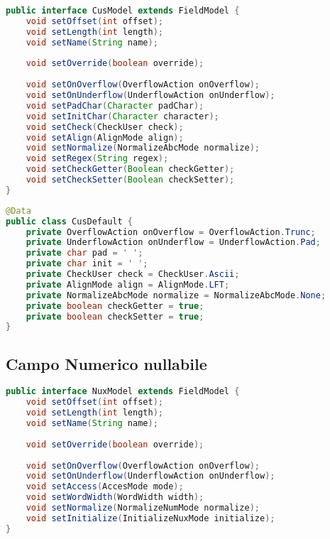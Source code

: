 \documentclass[a4paper,10pt]{report}
\begin{document}
\begin{lstlisting}[language=java, caption=interfaccia CusModel, 
label=code:CusModel]
public interface CusModel extends FieldModel {
    void setOffset(int offset);
    void setLength(int length);
    void setName(String name);
    
    void setOverride(boolean override);
    
    void setOnOverflow(OverflowAction onOverflow);
    void setOnUnderflow(UnderflowAction onUnderflow);
    void setPadChar(Character padChar);
    void setInitChar(Character character);
    void setCheck(CheckUser check);
    void setAlign(AlignMode align);
    void setNormalize(NormalizeAbcMode normalize);
    void setRegex(String regex);
    void setCheckGetter(Boolean checkGetter);
    void setCheckSetter(Boolean checkSetter);
}
\end{lstlisting}

\begin{lstlisting}[language=java, caption=class CusDefault, 
label=code:CusDefault]
@Data
public class CusDefault {
    private OverflowAction onOverflow = OverflowAction.Trunc;
    private UnderflowAction onUnderflow = UnderflowAction.Pad;
    private char pad = ' ';
    private char init = ' ';
    private CheckUser check = CheckUser.Ascii;
    private AlignMode align = AlignMode.LFT;
    private NormalizeAbcMode normalize = NormalizeAbcMode.None;
    private boolean checkGetter = true;
    private boolean checkSetter = true;
}
\end{lstlisting}

\subsection{Campo Numerico nullabile}

\begin{lstlisting}[language=java, caption=interfaccia NuxModel, 
label=code:NuxModel]
public interface NuxModel extends FieldModel {
    void setOffset(int offset);
    void setLength(int length);
    void setName(String name);
    
    void setOverride(boolean override);
    
    void setOnOverflow(OverflowAction onOverflow);
    void setOnUnderflow(UnderflowAction onUnderflow);
    void setAccess(AccesMode mode);
    void setWordWidth(WordWidth width);
    void setNormalize(NormalizeNumMode normalize);
    void setInitialize(InitializeNuxMode initialize);
}
\end{lstlisting}
\end{document}
